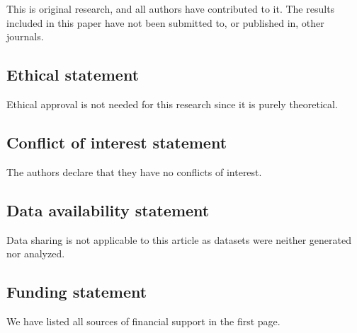 \documentclass[11pt]{amsart}
\theoremstyle{definition}
\begin{document}
This is original research, and all authors have contributed to it. The results included in this paper have not been submitted to, or published in, other journals.

\subsection*{Ethical statement}

Ethical approval is not needed for this research since it is purely theoretical.

\subsection*{Conflict of interest statement}

The authors declare that they have no conflicts of interest. 

\subsection*{Data availability statement}

Data sharing is not applicable to this article as datasets were neither generated nor analyzed.

\subsection*{Funding statement}

We have listed all sources of financial support in the first page.
\end{document}
